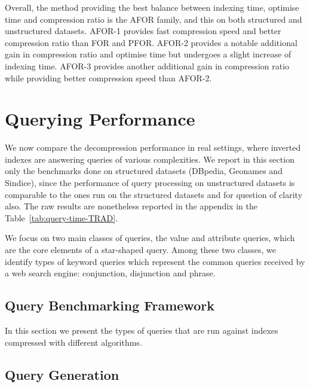 Overall, the method providing the best balance between indexing time, optimise
time and compression ratio is the AFOR family, and this on both structured and
unstructured datasets. AFOR-1 provides fast compression speed and better
compression ratio than FOR and PFOR. AFOR-2 provides a notable additional gain
in compression ratio and optimise time but undergoes a slight increase of
indexing time. AFOR-3 provides another additional gain in compression ratio
while providing better compression speed than AFOR-2.

\section{Querying Performance}
\label{sec:compression:query-performance}

We now compare the decompression performance in real settings, where inverted
indexes are answering queries of various complexities. We report in this
section only the benchmarks done on structured datasets (DBpedia,
Geonames and Sindice), since the performance of query processing on unstructured
datasets is comparable to the ones run on the structured datasets and for
question of clarity also. The raw results are nonetheless reported in the
appendix in the Table~\ref{tab:query-time-TRAD}.

We focus on two main classes of queries, the value and attribute queries, which
are the core elements of a star-shaped query. Among these two classes, we
identify types of keyword queries which represent the common queries received
by a web search engine: conjunction, disjunction and phrase.

\subsection{Query Benchmarking Framework}
\label{sec:bench-query-FW}

In this section we present the types of queries that are run against indexes
compressed with different algorithms.

\subsection{Query Generation}

